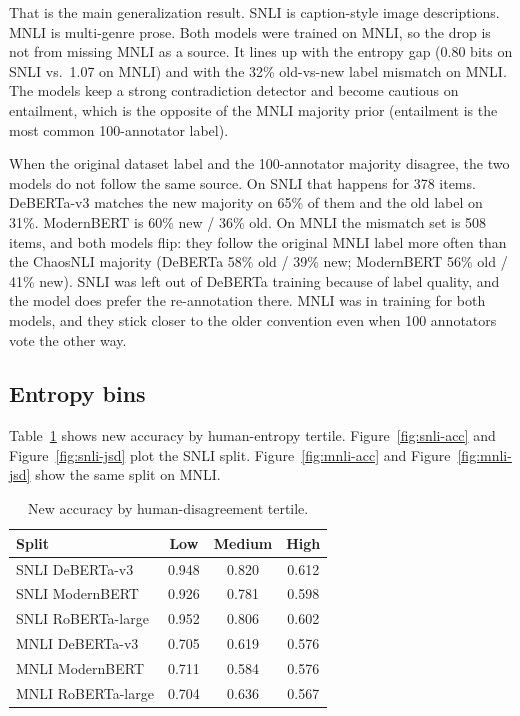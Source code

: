 \documentclass[11pt,a4paper]{article}
\begin{document}
That is the main generalization result. SNLI is caption-style image descriptions. MNLI is multi-genre prose. Both models were trained on MNLI, so the drop is not from missing MNLI as a source. It lines up with the entropy gap (0.80 bits on SNLI vs.\ 1.07 on MNLI) and with the 32\% old-vs-new label mismatch on MNLI. The models keep a strong contradiction detector and become cautious on entailment, which is the opposite of the MNLI majority prior (entailment is the most common 100-annotator label).

When the original dataset label and the 100-annotator majority disagree, the two models do not follow the same source. On SNLI that happens for 378 items. DeBERTa-v3 matches the new majority on 65\% of them and the old label on 31\%. ModernBERT is 60\% new / 36\% old. On MNLI the mismatch set is 508 items, and both models flip: they follow the original MNLI label more often than the ChaosNLI majority (DeBERTa 58\% old / 39\% new; ModernBERT 56\% old / 41\% new). SNLI was left out of DeBERTa training because of label quality, and the model does prefer the re-annotation there. MNLI was in training for both models, and they stick closer to the older convention even when 100 annotators vote the other way.

\subsection{Entropy bins}

Table~\ref{tab:bins-acc} shows new accuracy by human-entropy tertile. Figure~\ref{fig:snli-acc} and Figure~\ref{fig:snli-jsd} plot the SNLI split. Figure~\ref{fig:mnli-acc} and Figure~\ref{fig:mnli-jsd} show the same split on MNLI.

\begin{table}[H]
\centering
\small
\caption{New accuracy by human-disagreement tertile.}
\label{tab:bins-acc}
\begin{tabular}{lccc}
\toprule
Split & Low & Medium & High \\
\midrule
SNLI DeBERTa-v3 & 0.948 & 0.820 & 0.612 \\
SNLI ModernBERT & 0.926 & 0.781 & 0.598 \\
SNLI RoBERTa-large & 0.952 & 0.806 & 0.602 \\
MNLI DeBERTa-v3 & 0.705 & 0.619 & 0.576 \\
MNLI ModernBERT & 0.711 & 0.584 & 0.576 \\
MNLI RoBERTa-large & 0.704 & 0.636 & 0.567 \\
\bottomrule
\end{tabular}
\end{table}
\end{document}
